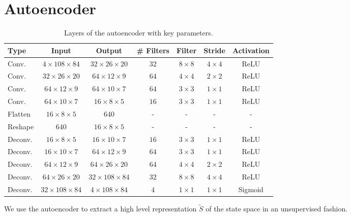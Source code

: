 \section{Autoencoder}\label{s:ae_training_details}
%
\begin{table}
    \centering
    \begin{tabular}{l c c c c c c} 
	\hline
	Type    & Input                     & Output                    & \# Filters & Filter & Stride       & Activation \\ 
	\hline 
	Conv.   & $4 \times 108 \times 84$  & $32 \times 26 \times 20$  & $32$ & $8 \times 8$ & $4 \times 4$ & ReLU    \\ 
	Conv.   & $32 \times 26 \times 20$  & $64 \times 12 \times 9$   & $64$ & $4 \times 4$ & $2 \times 2$ & ReLU    \\ 
	Conv.   & $64 \times 12 \times 9$   & $64 \times 10 \times 7$   & $64$ & $3 \times 3$ & $1 \times 1$ & ReLU    \\ 
	Conv.   & $64 \times 10 \times 7$   & $16 \times 8 \times 5$    & $16$ & $3 \times 3$ & $1 \times 1$ & ReLU    \\ 
	Flatten	& $16 \times 8 \times 5$    & $640$                     & -    & -            & -            & -       \\ 
	\hline
	Reshape & $640$                     & $16 \times 8 \times 5$    & -    & -            & -            & -       \\
	Deconv. & $16 \times 8 \times 5$    & $16 \times 10 \times 7$   & $16$ & $3 \times 3$ & $1 \times 1$ & ReLU    \\ 
	Deconv. & $16 \times 10 \times 7$   & $64 \times 12 \times 9$   & $64$ & $3 \times 3$ & $1 \times 1$ & ReLU    \\
	Deconv. & $64 \times 12 \times 9$   & $64 \times 26 \times 20$  & $64$ & $4 \times 4$ & $2 \times 2$ & ReLU    \\
	Deconv. & $64 \times 26 \times 20$  & $32 \times 108 \times 84$ & $32$ & $8 \times 8$ & $4 \times 4$ & ReLU    \\
	Deconv. & $32 \times 108 \times 84$ & $4 \times 108 \times 84$  & $4$  & $1 \times 1$ & $1 \times 1$ & Sigmoid \\
	\hline
    \end{tabular}
    \caption[Layers of the autoencoder with key parameters]{Layers of the 
	    autoencoder with key parameters.}
    \label{t:AE_structure}
\end{table}
%
We use the autoencoder to extract a high level representation $\tilde{S}$ of the
state space in an unsupervised fashion.

